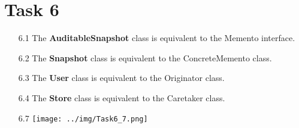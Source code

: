 \documentclass{article}
\begin{document}
\section*{Task 6}
\begin{itemize}
    \item[6.1] The \textbf{AuditableSnapshot} class is equivalent to the Memento interface. 
    \item[6.2] The \textbf{Snapshot} class is equivalent to the ConcreteMemento class. 
    \item[6.3] The \textbf{User} class is equivalent to the Originator class.
    \item[6.4] The \textbf{Store} class is equivalent to the Caretaker class.
    \item[6.7] \texttt{[image: ../img/Task6\_7.png]}   
\end{itemize}
\end{document}
